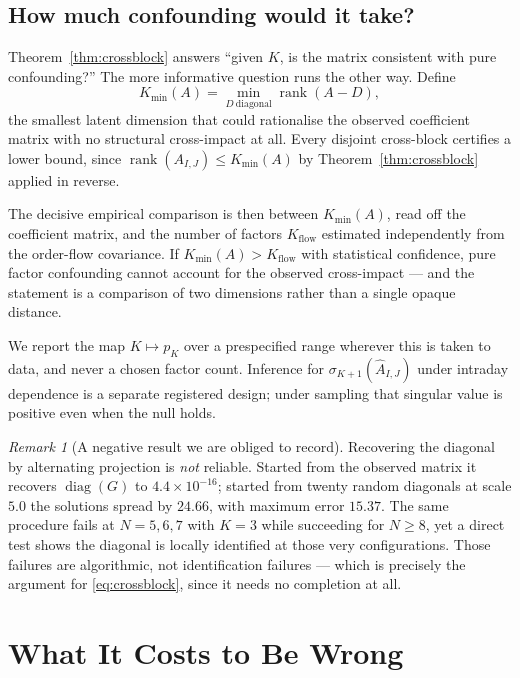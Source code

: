 \documentclass[10pt,twocolumn]{article}
\theoremstyle{remark}
\newtheorem{remark}{Remark}
\newcommand{\rank}{\operatorname{rank}}
\newcommand{\diag}{\operatorname{diag}}
\begin{document}
\subsection{How much confounding would it take?}
\label{sec:kmin}

Theorem~\ref{thm:crossblock} answers ``given $K$, is the matrix consistent with
pure confounding?'' The more informative question runs the other way. Define
\begin{equation}
K_{\min}(A)=\min_{D\ \text{diagonal}}\rank(A-D),
\label{eq:kmin}
\end{equation}
the smallest latent dimension that could rationalise the observed coefficient
matrix with no structural cross-impact at all. Every disjoint cross-block
certifies a lower bound, since $\rank(A_{I,J})\le K_{\min}(A)$ by
Theorem~\ref{thm:crossblock} applied in reverse.

The decisive empirical comparison is then between $K_{\min}(A)$, read off the
coefficient matrix, and the number of factors $K_{\text{flow}}$ estimated
independently from the order-flow covariance. If
$K_{\min}(A)>K_{\text{flow}}$ with statistical confidence, pure factor
confounding cannot account for the observed cross-impact --- and the statement
is a comparison of two dimensions rather than a single opaque distance.

We report the map $K\mapsto p_K$ over a prespecified range wherever this is
taken to data, and never a chosen factor count. Inference for
$\sigma_{K+1}(\widehat A_{I,J})$ under intraday dependence is a separate
registered design; under sampling that singular value is positive even when the
null holds.

\begin{remark}[A negative result we are obliged to record]
\label{rem:completion}
Recovering the diagonal by alternating projection is \emph{not} reliable.
Started from the observed matrix it recovers $\diag(G)$ to
$4.4\times10^{-16}$; started from twenty random diagonals at scale $5.0$ the
solutions spread by $24.66$, with maximum error $15.37$. The same procedure
fails at $N=5,6,7$ with $K=3$ while succeeding for $N\ge8$, yet a direct test
shows the diagonal is locally identified at those very configurations. Those
failures are algorithmic, not identification failures --- which is precisely
the argument for \eqref{eq:crossblock}, since it needs no completion at all.
\end{remark}

\section{What It Costs to Be Wrong}
\label{sec:cost}
\end{document}
